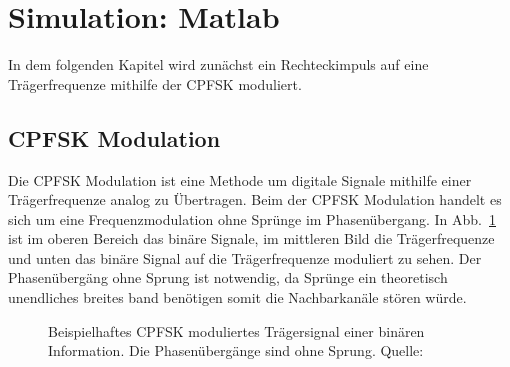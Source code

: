 \documentclass{article}
\begin{document}
\section{Simulation: Matlab}
In dem folgenden Kapitel wird zunächst ein Rechteckimpuls auf eine Trägerfrequenze mithilfe der \ac{CPFSK} moduliert.

\subsection{CPFSK Modulation}
Die \ac{CPFSK} Modulation ist eine Methode um digitale Signale mithilfe einer Trägerfrequenze analog zu Übertragen.
Beim der \ac{CPFSK} Modulation handelt es sich um eine Frequenzmodulation ohne Sprünge im Phasenübergang. In Abb.~\ref{fsk}
ist im oberen Bereich das binäre Signale, im mittleren Bild die Trägerfrequenze und unten das binäre Signal auf die Trägerfrequenze
moduliert zu sehen. Der Phasenübergäng ohne Sprung ist notwendig, da Sprünge ein theoretisch unendliches breites band benötigen
somit die Nachbarkanäle stören würde.
\begin{figure}[!h]
    \centering
    \def\svgscale{0.3}
    \def\svgwidth{\columnwidth}
    
    \caption{Beispielhaftes \ac{CPFSK} moduliertes Trägersignal einer binären 
    Information. Die Phasenübergänge sind ohne Sprung. Quelle:~\cite{wiki:fsk}}
    \label{fsk}
\end{figure}







\end{document}
